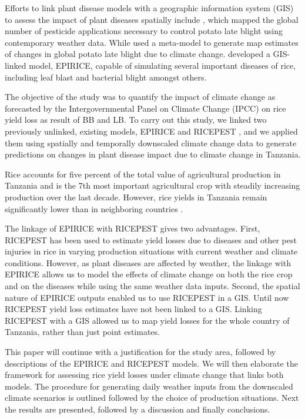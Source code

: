 \documentclass[preprint,12pt]{elsarticle}
\begin{document}
Efforts to link plant disease models with a geographic information system (GIS) to assess the impact of plant diseases spatially include  \citet{Hijmans2000}, which mapped the global number of pesticide applications necessary to control potato late blight using contemporary weather data. While \citet{Sparks2014} used a meta-model to generate map estimates of changes in global potato late blight due to climate change. \citet{Savary2012} developed a GIS-linked model, EPIRICE, capable of simulating several important diseases of rice, including leaf blast and bacterial blight amongst others.

The objective of the study was to quantify the impact of climate change as forecasted by the Intergovernmental Panel on Climate Change (IPCC) on rice yield loss as result of BB and LB. To carry out this study, we linked two previously unlinked, existing models, EPIRICE and RICEPEST \cite{Willocquet2000, Willocquet2002}, and we applied them using spatially and temporally downscaled climate change data to generate predictions on changes in plant disease impact due to climate change in Tanzania.

Rice accounts for five percent of the total value of agricultural production in Tanzania and is the 7th most important agricultural crop with steadily increasing production over the last decade. However, rice yields in Tanzania remain significantly lower than in neighboring countries \cite{Barreiro-Hurle2012}.

The linkage of EPIRICE with RICEPEST gives two advantages. First, RICEPEST has been used to estimate yield losses due to diseases and other pest injuries in rice in varying production situations with current weather and climate conditions. However, as plant diseases are affected by weather, the linkage with EPIRICE allows us to model the effects of climate change on both the rice crop and on the diseases while using the same weather data inputs. Second, the spatial nature of EPIRICE outputs enabled us to use RICEPEST in a GIS. Until now RICEPEST yield loss estimates have not been linked to a GIS. Linking RICEPEST with a GIS allowed us to map yield losses for the whole country of Tanzania, rather than just point estimates.

This paper will continue with a justification for the study area, followed by descriptions of the EPIRICE and RICEPEST models. We will then elaborate the framework for assessing rice yield losses under climate change that links both models. The procedure for generating daily weather inputs from the downscaled climate scenarios is outlined followed by the choice of production situations. Next the results are presented, followed by a discussion and finally conclusions.
\end{document}
